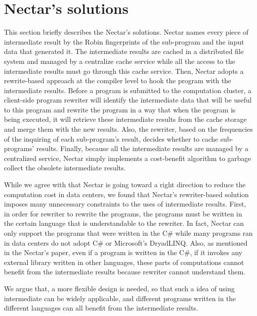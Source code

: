 \section{Nectar's solutions}

This section briefly describes the Nectar's solutions. Nectar names every piece of intermediate
result by the Robin fingerprints of the sub-program and the input
data that generated it.  The intermediate results are cached
in a distributed file system and managed by a centralize cache
service while all the access to the intermediate results must go through
this cache service.  Then, Nectar adopts a rewrite-based approach at
the compiler level to hook the program with the intermediate results.
Before a program is submitted to the computation cluster, a
client-side program rewriter will identify the intermediate data that
will be useful to this program and rewrite the program in a way that when the program is being executed, it will
retrieve these intermediate results from the cache storage and merge
them with the new results. Also, the rewriter, based on the frequencies of
the inquiring of each sub-program's result, decides whether to cache
sub-programs' results.  Finally, because all the intermediate results
are managed by a centralized service, Nectar simply implements a
cost-benefit algorithm to garbage collect the obsolete intermediate
results.

While we agree with that Nectar is going toward a right direction to reduce the
computation cost in data centers, we found that Nectar's rewriter-based
solution imposes many unnecessary constraints to the uses of intermediate results.
First, in order for rewriter to rewrite the programs, the
programs must be written in the certain language that is
understandable to the rewriter. In fact, Nectar can only support the programs that were
written in the C# while many programs ran in data centers do not
adopt C# or Microsoft's DryadLINQ. Also, as mentioned in the Nectar's paper,
even if a program is written in the C#, if it invokes any external library written in
other languages, these parts of computations cannot benefit
from the intermediate results because rewriter cannot understand them. 

We argue that, a more flexible design is needed, so that such a idea
of using intermediate can be widely applicable, and different programs written in the different
languages can all benefit from the intermediate results. 

